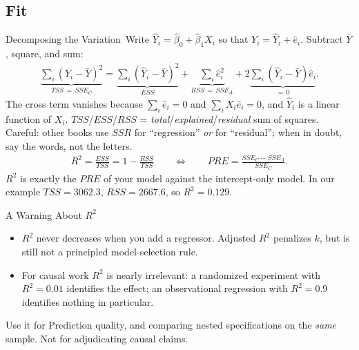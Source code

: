 \documentclass[aspectratio=169,11pt,xcolor=dvipsnames]{beamer}
\newcommand{\core}{\,\raisebox{0.6pt}{\textcolor{corestar}{$\bigstar$}}}
\begin{document}
\subsection*{Fit}
\begin{frame}\subsectionpage\end{frame}

\begin{frame}{Decomposing the Variation\core}
Write $\hat Y_i = \hat\beta_0 + \hat\beta_1 X_i$ so that
$Y_i = \hat Y_i + \hat e_i$. Subtract $\bar Y$, square, and sum:
\begin{align*}
  \underbrace{\sum_i (Y_i - \bar Y)^2}_{TSS \,=\, SSE_C}
  = \underbrace{\sum_i (\hat Y_i - \bar Y)^2}_{ESS}
  + \underbrace{\sum_i \hat e_i^2}_{RSS \,=\, SSE_A}
  + 2\underbrace{\sum_i (\hat Y_i - \bar Y)\hat e_i}_{=\,0} .
\end{align*}
The cross term vanishes because $\sum_i \hat e_i = 0$ and
$\sum_i X_i\hat e_i = 0$, and $\hat Y_i$ is a linear function of $X_i$.
\vskip1pt
{\footnotesize $TSS$/$ESS$/$RSS$ = \emph{total}/\emph{explained}/\emph{residual}
sum of squares. Careful: other books use $SSR$ for ``regression'' \emph{or} for
``residual''; when in doubt, say the words, not the letters.}
\vskip2pt
\begin{align*}
  R^2 = \frac{ESS}{TSS} = 1 - \frac{RSS}{TSS}
  \qquad\Longleftrightarrow\qquad
  PRE = \frac{SSE_C - SSE_A}{SSE_C} .
\end{align*}
\alert{$R^2$ is exactly the $PRE$ of your model against the intercept-only model.}
In our example $TSS = 3062.3$, $RSS = 2667.6$, so $R^2 = 0.129$.
\end{frame}

\begin{frame}{A Warning About $R^2$}
\begin{itemize}\itemsep4pt
  \item $R^2$ never decreases when you add a regressor. Adjusted $R^2$ penalizes
        $k$, but is still not a principled model-selection rule.
  \item For causal work $R^2$ is nearly irrelevant: a randomized experiment with
        $R^2 = 0.01$ identifies the effect; an observational regression with
        $R^2 = 0.9$ identifies nothing in particular.
\end{itemize}
\vskip6pt
\begin{block}{Use it for}
Prediction quality, and comparing nested specifications on the \emph{same} sample.
Not for adjudicating causal claims.
\end{block}
\end{frame}
\end{document}
